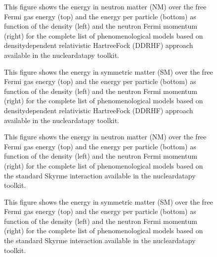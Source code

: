 \documentclass[letterpaper,10pt,english]{sphinxmanual}
\begin{document}
\begin{figure}[htbp]
\centering
\capstart

\noindent{}
\caption{This figure shows the energy in neutron matter (NM) over the free Fermi gas energy (top) and the energy per particle (bottom) as function of the density (left) and the neutron Fermi momentum (right) for the complete list of phenomenological models based on density\sphinxhyphen{}dependent relativistic Hartree\sphinxhyphen{}Fock (DDRHF) approach available in the nucleardatapy toolkit.}\label{\detokenize{source/api/setup_eos_pheno:id5}}\end{figure}

\begin{figure}[htbp]
\centering
\capstart

\noindent{}
\caption{This figure shows the energy in symmetric matter (SM) over the free Fermi gas energy (top) and the energy per particle (bottom) as function of the density (left) and the neutron Fermi momentum (right) for the complete list of phenomenological models based on density\sphinxhyphen{}dependent relativistic Hartree\sphinxhyphen{}Fock (DDRHF) approach available in the nucleardatapy toolkit.}\label{\detokenize{source/api/setup_eos_pheno:id6}}\end{figure}

\begin{figure}[htbp]
\centering
\capstart

\noindent{}
\caption{This figure shows the energy in neutron matter (NM) over the free Fermi gas energy (top) and the energy per particle (bottom) as function of the density (left) and the neutron Fermi momentum (right) for the complete list of phenomenological models based on the standard Skyrme interaction available in the nucleardatapy toolkit.}\label{\detokenize{source/api/setup_eos_pheno:id7}}\end{figure}

\begin{figure}[htbp]
\centering
\capstart

\noindent{}
\caption{This figure shows the energy in symmetric matter (SM) over the free Fermi gas energy (top) and the energy per particle (bottom) as function of the density (left) and the neutron Fermi momentum (right) for the complete list of phenomenological models based on the standard Skyrme interaction available in the nucleardatapy toolkit.}\label{\detokenize{source/api/setup_eos_pheno:id8}}\end{figure}
\end{document}
